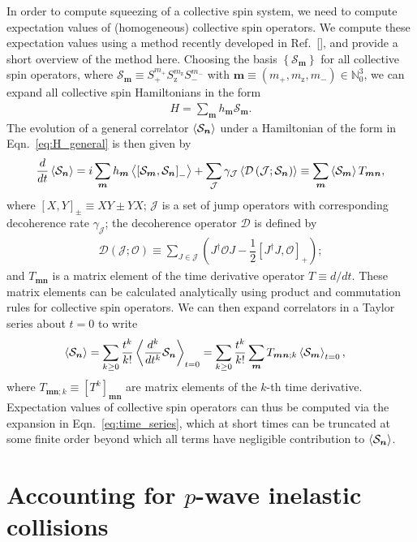 \documentclass{nature}
\newcommand{\f}[2]{\dfrac{#1}{#2}} %
\newcommand{\p}[1]{\left(#1\right)} %
\renewcommand{\sp}[1]{\left[#1\right]} %
\renewcommand{\set}[1]{\left\{#1\right\}} %
\renewcommand{\v}{\bm} %
\newcommand{\bk}{\Braket}
\newcommand{\J}{\mathcal{J}}
\renewcommand{\O}{\mathcal{O}}
\renewcommand{\S}{\mathcal{S}}
\newcommand{\z}{\text{z}}
\begin{document}
In order to compute squeezing of a collective spin system, we need to compute expectation values of (homogeneous) collective spin operators.
We compute these expectation values using a method recently developed in Ref.~[], and provide a short overview of the method here.
Choosing the basis $\set{\S_{\v m}}$ for all collective spin operators, where $\S_{\v m}\equiv S_+^{m_+} S_\z^{m_\z} S_-^{m_-}$ with
$\v m\equiv\p{m_+,m_\z,m_-}\in\mathbb{N}_0^3$, we can expand all
collective spin Hamiltonians in the form
\begin{align}
  H = \sum_{\v m} h_{\v m} \S_{\v m}.
  \label{eq:H_general}
\end{align}
The evolution of a general correlator $\bk{\S_{\v n}}$ under a Hamiltonian of the form in Eqn.~\eqref{eq:H_general} is then given by
\begin{align}
  \f{d}{dt} \bk{\S_{\v n}}
  = i \sum_{\v m} h_{\v m}
  \bk{\sp{\S_{\v m}, \S_{\v n}}_-}
  + \sum_\J \gamma_\J \bk{\mathcal D\p{\J; \S_{\v n}}}
  \equiv \sum_{\v m} \bk{\S_{\v m}} T_{\v m\v n},
\end{align}
where $\sp{X,Y}_\pm\equiv XY\pm YX$; $\J$ is a set of jump operators with corresponding decoherence rate $\gamma_\J$; the decoherence operator $\mathcal D$ is defined by
\begin{align}
  \mathcal{D}\p{\J;\O}
  \equiv \sum_{J\in\J}\p{J^\dag \O J - \f12\sp{J^\dag J,\O}_+};
\end{align}
and $T_{\v m\v n}$ is a matrix element of the time derivative operator $T\equiv d/dt$.
These matrix elements can be calculated analytically using product and commutation rules for collective spin operators.
We can then expand correlators in a Taylor series about $t=0$ to write
\begin{align}
  \bk{\S_{\v n}}
  &= \sum_{k\ge0} \f{t^k}{k!} \bk{\f{d^k}{dt^k} \S_{\v n}}_{t=0}
  = \sum_{k\ge0} \f{t^k}{k!}
  \sum_{\v m} T_{\v m\v n;k} \bk{\S_{\v m}}_{t=0},
  \label{eq:time_series}
\end{align}
where $T_{\v m\v n;k}\equiv\sp{T^k}_{\v m\v n}$ are matrix elements of the $k$-th time derivative.
Expectation values of collective spin operators can thus be computed via the expansion in Eqn.~\eqref{eq:time_series}, which at short times can be truncated at some finite order beyond which all terms have negligible contribution to $\bk{\S_{\v n}}$.


\section*{Accounting for $p$-wave inelastic collisions}
\end{document}
